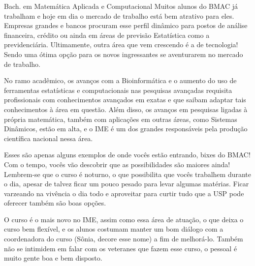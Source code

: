 \begin{subsecao}{Bach. em Matemática Aplicada e Computacional}
Muitos alunos do BMAC já trabalham e hoje em dia o mercado de trabalho está bem atrativo para eles.
Empresas grandes e bancos procuram esse perfil dinâmico para postos de análise
financeira, crédito ou ainda em áreas de previsão Estatística como a
previdenciária. Ultimamente, outra área que vem crescendo é a de tecnologia! Sendo uma
ótima opção para os novos ingressantes se aventurarem no mercado de trabalho.

No ramo acadêmico, os avanços com a Bioinformática e o aumento do uso de
ferramentas estatísticas e computacionais nas pesquisas avançadas requisita
profissionais com conhecimentos avançados em exatas e que saibam adaptar tais
conhecimentos à área em questão. Além disso, os avanços em pesquisas ligadas à
própria matemática, também com aplicações em outras áreas, como Sistemas
Dinâmicos, estão em alta, e o IME é um dos grandes responsáveis pela produção
científica nacional nessa área.

Esses são apenas alguns exemplos de onde vocês estão entrando, bixes do BMAC! Com o tempo,
vocês vão descobrir que as possibilidades são maiores ainda! Lembrem-se que o
curso é noturno, o que possibilita que vocês trabalhem durante o dia, apesar de talvez
ficar um pouco pesado para levar algumas matérias. Ficar varzeando na vivência o dia todo 
e aproveitar para curtir tudo que a USP pode oferecer também são boas opções.

O curso é o mais novo no IME, assim como essa área de atuação, o que deixa o curso
bem flexível, e os alunos costumam manter um bom diálogo com a coordenadora do
curso (Sônia, decore esse nome) a fim de melhorá-lo. Também não se intimidem
em falar com os veteranes que fazem esse curso, o pessoal é muito gente boa e bem disposto.

\end{subsecao}
